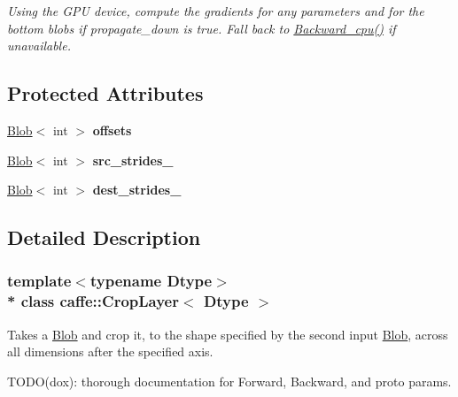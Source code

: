 \begin{DoxyCompactItemize}
\begin{DoxyCompactList}\small\item\em Using the G\+PU device, compute the gradients for any parameters and for the bottom blobs if propagate\+\_\+down is true. Fall back to \hyperlink{classcaffe_1_1CropLayer_abf342bcb5e278303fd0c8e90016c2df2}{Backward\+\_\+cpu()} if unavailable. \end{DoxyCompactList}\end{DoxyCompactItemize}
\subsection*{Protected Attributes}
\begin{DoxyCompactItemize}
\item 
\hyperlink{classcaffe_1_1Blob}{Blob}$<$ int $>$ {\bfseries offsets}\hypertarget{classcaffe_1_1CropLayer_a6f3f5d6bd46571c67029fb5833c633eb}{}\label{classcaffe_1_1CropLayer_a6f3f5d6bd46571c67029fb5833c633eb}

\item 
\hyperlink{classcaffe_1_1Blob}{Blob}$<$ int $>$ {\bfseries src\+\_\+strides\+\_\+}\hypertarget{classcaffe_1_1CropLayer_ad481af17ee552835c1da2d12ef555e97}{}\label{classcaffe_1_1CropLayer_ad481af17ee552835c1da2d12ef555e97}

\item 
\hyperlink{classcaffe_1_1Blob}{Blob}$<$ int $>$ {\bfseries dest\+\_\+strides\+\_\+}\hypertarget{classcaffe_1_1CropLayer_a21f818a429e142839a18b7b0693ead88}{}\label{classcaffe_1_1CropLayer_a21f818a429e142839a18b7b0693ead88}

\end{DoxyCompactItemize}


\subsection{Detailed Description}
\subsubsection*{template$<$typename Dtype$>$\\*
class caffe\+::\+Crop\+Layer$<$ Dtype $>$}

Takes a \hyperlink{classcaffe_1_1Blob}{Blob} and crop it, to the shape specified by the second input \hyperlink{classcaffe_1_1Blob}{Blob}, across all dimensions after the specified axis. 

T\+O\+D\+O(dox)\+: thorough documentation for Forward, Backward, and proto params. 

